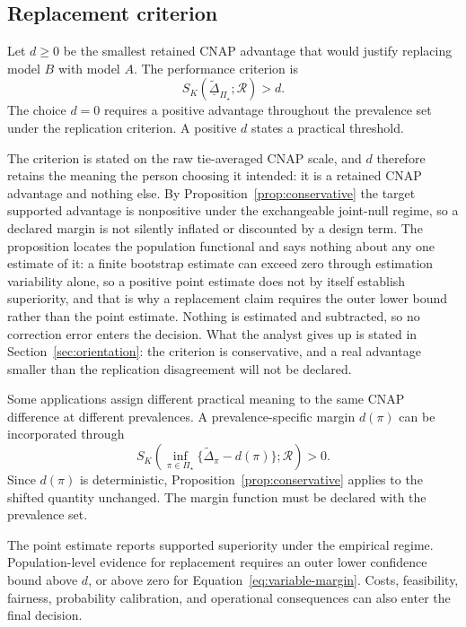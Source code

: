 \documentclass[11pt]{article}
\newcommand{\Regime}{\mathcal{R}}
\newcommand{\PSet}{\Pi_\star}
\newcommand{\Dta}{\widetilde{\Delta}}
\newcommand{\RobDta}{\underline{\widetilde{\Delta}}_{\PSet}}
\theoremstyle{remark}
\begin{document}
\subsection{Replacement criterion}
\label{sec:replacement}

Let $d\geq0$ be the smallest retained CNAP advantage that would justify replacing model $B$ with model $A$. The performance criterion is
\begin{equation}
S_K(\RobDta;\Regime)>d.
\label{eq:replacement}
\end{equation}
The choice $d=0$ requires a positive advantage throughout the prevalence set under the replication criterion. A positive $d$ states a practical threshold.

The criterion is stated on the raw tie-averaged CNAP scale, and $d$ therefore retains the meaning the person choosing it intended: it is a retained CNAP advantage and nothing else. By Proposition~\ref{prop:conservative} the target supported advantage is nonpositive under the exchangeable joint-null regime, so a declared margin is not silently inflated or discounted by a design term. The proposition locates the population functional and says nothing about any one estimate of it: a finite bootstrap estimate can exceed zero through estimation variability alone, so a positive point estimate does not by itself establish superiority, and that is why a replacement claim requires the outer lower bound rather than the point estimate. Nothing is estimated and subtracted, so no correction error enters the decision. What the analyst gives up is stated in Section~\ref{sec:orientation}: the criterion is conservative, and a real advantage smaller than the replication disagreement will not be declared.

Some applications assign different practical meaning to the same CNAP difference at different prevalences. A prevalence-specific margin $d(\pi)$ can be incorporated through
\begin{equation}
S_K\left(
\inf_{\pi\in\PSet}
\{\Dta_\pi-d(\pi)\};
\Regime
\right)>0.
\label{eq:variable-margin}
\end{equation}
Since $d(\pi)$ is deterministic, Proposition~\ref{prop:conservative} applies to the shifted quantity unchanged. The margin function must be declared with the prevalence set.

The point estimate reports supported superiority under the empirical regime. Population-level evidence for replacement requires an outer lower confidence bound above $d$, or above zero for Equation~\eqref{eq:variable-margin}. Costs, feasibility, fairness, probability calibration, and operational consequences can also enter the final decision.
\end{document}
